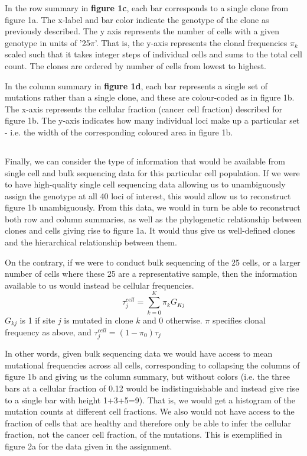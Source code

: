 \documentclass{article}
\begin{document}
In the row summary in \textbf{figure 1c}, each bar corresponds to a single clone from figure 1a. The x-label and bar color indicate the genotype of the clone as previously described.  The y axis represents the number of cells with a given genotype in units of '25$\pi$'. That is, the y-axis represents the clonal frequencies $\pi_k$ scaled such that it takes integer steps of individual cells and sums to the total cell count. The clones are ordered by number of cells from lowest to highest.

In the column summary in \textbf{figure 1d}, each bar represents a single set of mutations rather than a single clone, and these are colour-coded as in figure 1b. The x-axis represents the cellular fraction (cancer cell fraction) described for figure 1b. The y-axis indicates how many individual loci make up a particular set - i.e. the width of the corresponding coloured area in figure 1b.
\subsection{}

Finally, we can consider the type of information that would be available from single cell and bulk sequencing data for this particular cell population. If we were to have high-quality single cell sequencing data allowing us to unambiguously assign the genotype at all 40 loci of interest, this would allow us to reconstruct figure 1b unambiguously. From this data, we would in turn be able to reconstruct both row and column summaries, as well as the phylogenetic relationship between clones and cells giving rise to figure 1a. It would thus give us well-defined clones and the hierarchical relationship between them.

On the contrary, if we were to conduct bulk sequencing of the 25 cells, or a larger number of cells where these 25 are a representative sample, then the information available to us would instead be cellular frequencies.
\begin{equation}
\tau_j^{cell} = \sum_{k=0}^K{\pi_k G_{Kj}}
\end{equation}
$G_{kj}$ is 1 if site $j$ is mutated in clone $k$ and 0 otherwise. $\pi$ specifies clonal frequency as above, and $\tau_j^{cell} = (1-\pi_0)\tau_j$

In other words, given bulk sequencing data we would have access to mean mutational frequencies across all cells, corresponding to collapsing the columns of figure 1b and giving us the column summary, but without colors (i.e. the three bars at a cellular fraction of 0.12 would be indistinguishable and instead give rise to a single bar with height 1+3+5=9). That is, we would get a histogram of the mutation counts at different cell fractions. We also would not have access to the fraction of cells that are healthy and therefore only be able to infer the cellular fraction, not the cancer cell fraction, of the mutations. This is exemplified in figure 2a for the data given in the assignment.
\end{document}
